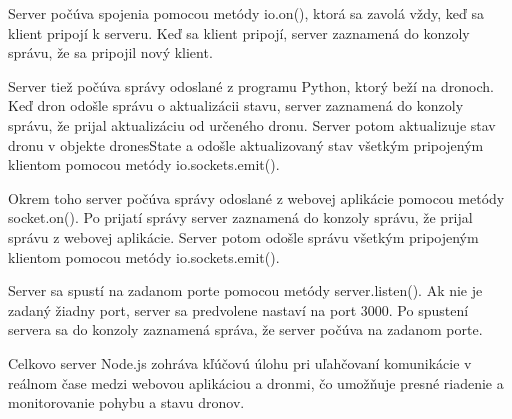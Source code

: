 Server počúva spojenia pomocou metódy io.on(), ktorá sa zavolá vždy, keď sa klient pripojí k serveru. Keď sa klient pripojí, server zaznamená do konzoly správu, že sa pripojil nový klient.

Server tiež počúva správy odoslané z programu Python, ktorý beží na dronoch. Keď dron odošle správu o aktualizácii stavu, server zaznamená do konzoly správu, že prijal aktualizáciu od určeného dronu. Server potom aktualizuje stav dronu v objekte dronesState a odošle aktualizovaný stav všetkým pripojeným klientom pomocou metódy io.sockets.emit().

Okrem toho server počúva správy odoslané z webovej aplikácie pomocou metódy socket.on(). Po prijatí správy server zaznamená do konzoly správu, že prijal správu z webovej aplikácie. Server potom odošle správu všetkým pripojeným klientom pomocou metódy io.sockets.emit().

Server sa spustí na zadanom porte pomocou metódy server.listen(). Ak nie je zadaný žiadny port, server sa predvolene nastaví na port 3000. Po spustení servera sa do konzoly zaznamená správa, že server počúva na zadanom porte.

Celkovo server Node.js zohráva kľúčovú úlohu pri uľahčovaní komunikácie v reálnom čase medzi webovou aplikáciou a dronmi, čo umožňuje presné riadenie a monitorovanie pohybu a stavu dronov.